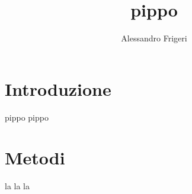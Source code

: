 \documentclass[]{gfossday} %
\title{pippo}
\author{Alessandro Frigeri}
\begin{document}
\maketitle

\section{Introduzione}

pippo pippo

\section{Metodi}

la la la 
\end{document}
